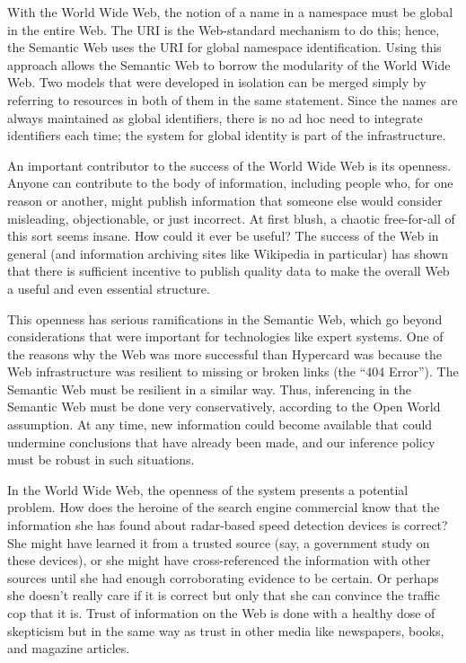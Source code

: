 With the World Wide Web, the notion of a name in a namespace must be
global in the entire Web.
The URI is the Web-standard mechanism to do this; hence, the Semantic
Web uses the URI for global namespace identification. Using this
approach allows the Semantic Web to borrow the modularity of the World
Wide Web. Two models that were developed in isolation can be merged
simply by referring to resources in both of them in the same statement.
Since the names are always maintained as global identifiers, there is no
ad hoc need to integrate identifiers each time; the system for global
identity is part of the infrastructure.

An important contributor to the success of the World Wide Web is its
openness. Anyone can contribute to the body of information, including
people who, for one reason or another, might publish information that
someone else would consider misleading, objectionable, or just
incorrect. At first blush, a chaotic free-for-all of this sort seems
insane. How could it ever be useful? The success of the Web in general
(and information archiving sites like Wikipedia in particular) has shown
that there is sufficient incentive to publish quality data to make the
overall Web a useful and even essential structure.

This openness has serious ramifications in the Semantic Web, which go
beyond considerations that were important for technologies like expert
systems. One of the reasons why the Web was more successful than
Hypercard was because the Web infrastructure was resilient to missing or
broken links (the ``404 Error''). The Semantic Web must be resilient in
a similar way. Thus, inferencing in the Semantic Web must be done very
conservatively, according to the Open World assumption. At any time, new
information could become available that could undermine conclusions that
have already been made, and our inference policy must be robust in such
situations.

In the World Wide Web, the openness of the system presents a potential
problem. How does the heroine of the search engine commercial know that
the information she has found about radar-based speed detection devices is correct? She might have learned it from a
trusted source (say, a government study on these devices), or she might
have cross-referenced the information with other sources until she had
enough corroborating evidence to be certain. Or perhaps she doesn't
really care if it is correct but only that she can convince the traffic
cop that it is. Trust of information on the Web is done with a healthy
dose of skepticism but in the same way as trust in other media like
newspapers, books, and magazine articles.

